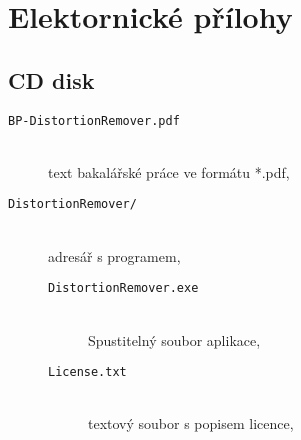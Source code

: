 \chapter{Elektornické přílohy}
\label{user-guide}

\section{CD disk}

\label{app:cd}
    
    \begin{description}
        \item[\tt BP-DistortionRemover.pdf] ~ \\ text bakalářské práce ve formátu *.pdf,
    	
        
        \item[\tt DistortionRemover/] ~ \\ adresář s programem,
        \begin{description}
        		
        		\item[\tt DistortionRemover.exe] ~ \\ Spustitelný soubor aplikace,
        		
        		\item[\tt License.txt] ~ \\ textový soubor s popisem licence,
        		

\end{description}
\end{description}
